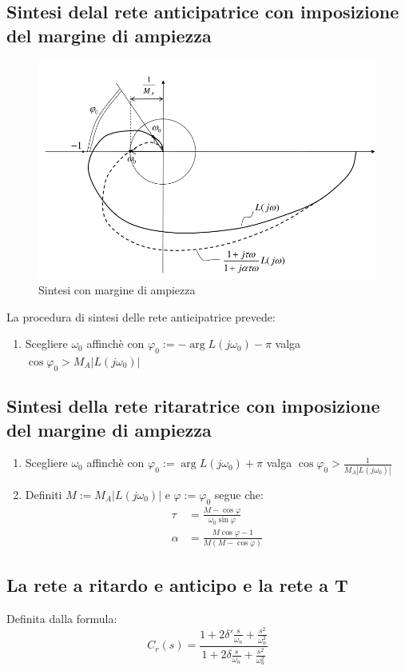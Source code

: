 \subsection{Sintesi delal rete anticipatrice con imposizione del margine di ampiezza}
\begin{figure}[h!]
  \centering
  \includegraphics[width=0.5\linewidth]{./images/sintesi_con_margine_ampiezza.png}
  \caption{Sintesi con margine di ampiezza}
  \label{fig:sintesi_con_margine_ampiezza}
\end{figure}


La procedura di sintesi delle rete anticipatrice prevede:
\begin{enumerate}
  \item Scegliere $\omega_0$ affinchè con $\varphi_0 := -\arg L(j\omega_0) -\pi$
    valga $\cos \varphi_0 > M_A |L(j\omega_0)|$
\end{enumerate}

\subsection{Sintesi della rete ritaratrice con imposizione del margine di ampiezza}
\begin{enumerate}
  \item Scegliere $\omega_0$ affinchè con $\varphi_0 := \arg L(j\omega_0) + \pi$
    valga $\cos \varphi_0 > \frac{1}{M_A |L(j\omega_0)|}$

  \item Definiti $M := M_A |L(j\omega_0)|$ e $\varphi := \varphi_0$
    segue che:
    \begin{align}
      \tau &= \frac{M - \cos \varphi}{\omega_0 \sin \varphi} \\
      \alpha &= \frac{M \cos \varphi - 1}{M(M - \cos \varphi)}
    \end{align}
\end{enumerate}


\subsection{La rete a ritardo e anticipo e la rete a T}
Definita dalla formula:
\begin{equation}
  C_r(s) = \frac{1 + 2 \delta' \frac{s}{\omega_n} + \frac{s^2}{\omega_n^2}}{
    1 + 2 \delta \frac{s}{\omega_n} + \frac{s^2}{\omega_n^2}
  }
\end{equation}

